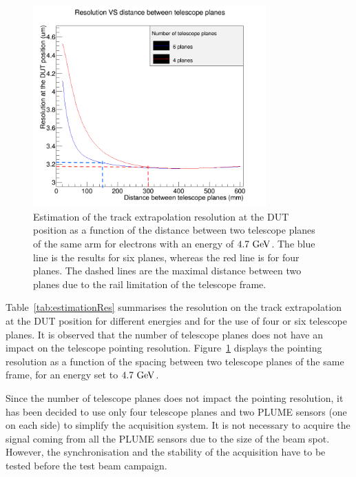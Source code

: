     \begin{figure}[!thb]
      \centering
      \includegraphics[width = 0.8\textwidth]{Pictures/X0/resolution_4Vs6planes_4-7GeV.png}
      \caption{Estimation of the track extrapolation resolution at the DUT position as a function of the distance between two telescope planes of the same arm for electrons with an energy of $4.7~\rm{GeV}$.
      The blue line is the results for six planes, whereas the red line is for four planes. 
      The dashed lines are the maximal distance between two planes due to the rail limitation of the telescope frame.}
      \label{fig:estimationRes4.7GeV}
    \end{figure}

    Table~\ref{tab:estimationRes} summarises the resolution on the track extrapolation at the \gls{DUT} position for different energies and for the use of four or six telescope planes.
    It is observed that the number of telescope planes does not have an impact on the telescope pointing resolution.
    Figure~\ref{fig:estimationRes4.7GeV} displays the pointing resolution as a function of the spacing between two telescope planes of the same frame, for an energy set to $4.7~\rm{GeV}$.

    Since the number of telescope planes does not impact the pointing resolution, it has been decided to use only four telescope planes and two \gls{PLUME} sensors (one on each side) to simplify the acquisition system.
    It is not necessary to acquire the signal coming from all the \gls{PLUME} sensors due to the size of the beam spot. 
    However, the synchronisation and the stability of the acquisition have to be tested before the test beam campaign. 

